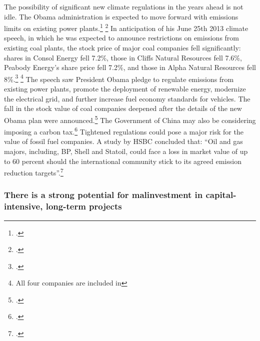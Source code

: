 The possibility of significant new climate regulations in the years ahead is not idle.
The Obama administration is expected to move forward with emissions limits on existing power plants.\footcite[][]{ReadyingLimits} \footcite[][]{ObamaJune2013}
In anticipation of his June 25th 2013 climate speech, in which he was expected to announce restrictions on  emissions from existing coal plants, the stock price of major coal companies fell significantly: shares in Consol Energy fell 7.2\%, those in Cliffs Natural Resources fell 7.6\%, Peabody Energy's share price fell 7.2\%, and those in Alpha Natural Resources fell 8\%.\footcite[][]{CoalSharesPlunge} \footnote{All four companies are included in }
The speech saw President Obama pledge to regulate  emissions from existing power plants, promote the deployment of renewable energy, modernize the electrical grid, and further increase fuel economy standards for vehicles.
The fall in the stock value of coal companies deepened after the details of the new Obama plan were announced.\footcite[][]{CCPlanPoundsCoal}
The Government of China may also be considering imposing a carbon tax.\footcite[][]{ChinaTaxingCarbon}
Tightened regulations could pose a major risk for the value of fossil fuel companies.
A study by HSBC concluded that: ``Oil and gas majors, including, BP, Shell and Statoil, could face a loss in market value of up to 60 percent should the international community stick to its agreed emission reduction targets''.\footcite[][]{EconomicCase}



	\subsubsection {There is a strong potential for malinvestment in capital-intensive, long-term projects}



